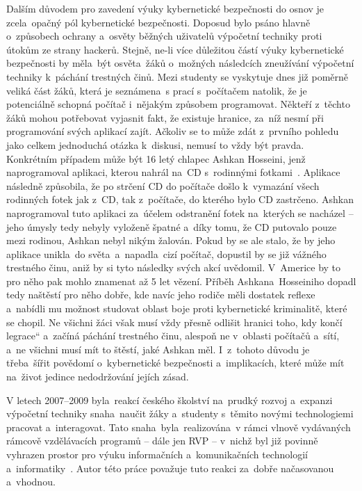 \documentclass[a4paper, 12pt]{article}
\providecommand{\uv}[1]{\quotedblbase #1\textquotedblleft}
\begin{document}
Dalším důvodem pro zavedení výuky kybernetické bezpečnosti do osnov je zcela~opačný pól kybernetické bezpečnosti. Doposud bylo psáno hlavně o~způsobech ochrany a~osvěty běžných uživatelů výpočetní techniky proti útokům ze strany hackerů. Stejně, ne-li více důležitou částí výuky kybernetické bezpečnosti by měla~být osvěta~žáků o~možných následcích zneužívání výpočetní techniky k~páchání trestných činů. Mezi studenty se vyskytuje dnes již poměrně veliká část žáků, která je seznámena~s prací s~počítačem natolik, že je potenciálně schopná počítač i~nějakým způsobem programovat. Někteří z~těchto žáků mohou potřebovat vyjasnit fakt, že existuje hranice, za~níž nesmí při programování svých aplikací zajít. Ačkoliv se to může zdát z~prvního pohledu jako celkem jednoduchá otázka k~diskusi, nemusí to vždy být pravda. Konkrétním případem může být 16 letý chlapec Ashkan Hosseini, jenž naprogramoval aplikaci, kterou nahrál na~CD s~rodinnými fotkami~\cite{malwareUnicornAppretince}. Aplikace následně způsobila, že po strčení CD do počítače došlo k~vymazání všech rodinných fotek jak z~CD, tak z~počítače, do kterého bylo CD zastrčeno. Ashkan naprogramoval tuto aplikaci za~účelem odstranění fotek na~kterých se nacházel -- jeho úmysly tedy nebyly vyloženě špatné a~díky tomu, že CD putovalo pouze mezi rodinou, Ashkan nebyl nikým žalován. Pokud by se ale stalo, že by jeho aplikace unikla~do světa~a~napadla~cizí počítač, dopustil by se již vážného trestného činu, aniž by si tyto následky svých akcí uvědomil. V~Americe by to pro něho pak mohlo znamenat až 5 let vězení. Příběh Ashkana~Hosseiniho dopadl tedy naštěstí pro něho dobře, kde navíc jeho rodiče měli dostatek reflexe a~nabídli mu možnost studovat oblast boje proti kybernetické kriminalitě, které se chopil. Ne všichni žáci však musí vždy přesně odlišit hranici toho, kdy končí \uv{legrace} a~začíná páchání trestného činu, alespoň ne v~oblasti počítačů a~sítí, a~ne všichni musí mít to štěstí, jaké Ashkan měl. I~z~tohoto důvodu je třeba~šířit povědomí o~kybernetické bezpečnosti a~implikacích, které může mít na~život jedince nedodržování jejích zásad. 

V letech 2007--2009 byla~reakcí českého školství na~prudký rozvoj a~expanzi výpočetní techniky snaha~naučit žáky a~studenty s~těmito novými technologiemi pracovat a~interagovat. Tato snaha~byla~realizována~v rámci vlnově vydávaných rámcově vzdělávacích programů -- dále jen RVP -- v~nichž byl již povinně vyhrazen prostor pro výuku informačních a~komunikačních technologií a~informatiky~\cite{waveRVP}. Autor této práce považuje tuto reakci za~dobře načasovanou a~vhodnou. 
\end{document}
